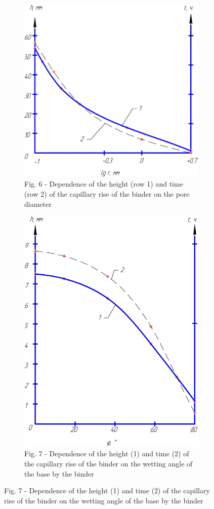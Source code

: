 \begin{figure}[H]
    \centering
    \begin{subfigure}{0.45\textwidth}
        \centering
        \includegraphics[width=\textwidth]{media/gorn2/image9}
        \caption*{Fig. 6 - Dependence of the height (row 1) and time (row 2) of the capillary rise of the binder on the pore diameter}
    \end{subfigure}
    \hfill
    \begin{subfigure}{0.45\textwidth}
        \centering
        \includegraphics[width=\textwidth, height=\textwidth]{media/gorn2/image10}
        \caption*{Fig. 7 - Dependence of the height (1) and time (2) of the capillary rise of the binder on the wetting angle of the base by the binder}
    \end{subfigure}
\end{figure}

